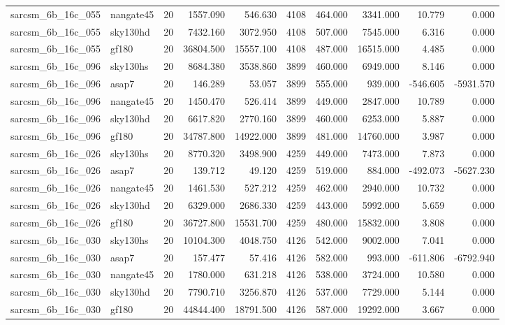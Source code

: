 \begin{longtable}{llrrrrrrrr}
sarcsm\_6b\_16c\_055 & nangate45 & 20 & 1557.090 & 546.630 & 4108 & 464.000 & 3341.000 & 10.779 & 0.000 \\
sarcsm\_6b\_16c\_055 & sky130hd & 20 & 7432.160 & 3072.950 & 4108 & 507.000 & 7545.000 & 6.316 & 0.000 \\
sarcsm\_6b\_16c\_055 & gf180 & 20 & 36804.500 & 15557.100 & 4108 & 487.000 & 16515.000 & 4.485 & 0.000 \\
sarcsm\_6b\_16c\_096 & sky130hs & 20 & 8684.380 & 3538.860 & 3899 & 460.000 & 6949.000 & 8.146 & 0.000 \\
sarcsm\_6b\_16c\_096 & asap7 & 20 & 146.289 & 53.057 & 3899 & 555.000 & 939.000 & -546.605 & -5931.570 \\
sarcsm\_6b\_16c\_096 & nangate45 & 20 & 1450.470 & 526.414 & 3899 & 449.000 & 2847.000 & 10.789 & 0.000 \\
sarcsm\_6b\_16c\_096 & sky130hd & 20 & 6617.820 & 2770.160 & 3899 & 460.000 & 6253.000 & 5.887 & 0.000 \\
sarcsm\_6b\_16c\_096 & gf180 & 20 & 34787.800 & 14922.000 & 3899 & 481.000 & 14760.000 & 3.987 & 0.000 \\
sarcsm\_6b\_16c\_026 & sky130hs & 20 & 8770.320 & 3498.900 & 4259 & 449.000 & 7473.000 & 7.873 & 0.000 \\
sarcsm\_6b\_16c\_026 & asap7 & 20 & 139.712 & 49.120 & 4259 & 519.000 & 884.000 & -492.073 & -5627.230 \\
sarcsm\_6b\_16c\_026 & nangate45 & 20 & 1461.530 & 527.212 & 4259 & 462.000 & 2940.000 & 10.732 & 0.000 \\
sarcsm\_6b\_16c\_026 & sky130hd & 20 & 6329.000 & 2686.330 & 4259 & 443.000 & 5992.000 & 5.659 & 0.000 \\
sarcsm\_6b\_16c\_026 & gf180 & 20 & 36727.800 & 15531.700 & 4259 & 480.000 & 15832.000 & 3.808 & 0.000 \\
sarcsm\_6b\_16c\_030 & sky130hs & 20 & 10104.300 & 4048.750 & 4126 & 542.000 & 9002.000 & 7.041 & 0.000 \\
sarcsm\_6b\_16c\_030 & asap7 & 20 & 157.477 & 57.416 & 4126 & 582.000 & 993.000 & -611.806 & -6792.940 \\
sarcsm\_6b\_16c\_030 & nangate45 & 20 & 1780.000 & 631.218 & 4126 & 538.000 & 3724.000 & 10.580 & 0.000 \\
sarcsm\_6b\_16c\_030 & sky130hd & 20 & 7790.710 & 3256.870 & 4126 & 537.000 & 7729.000 & 5.144 & 0.000 \\
sarcsm\_6b\_16c\_030 & gf180 & 20 & 44844.400 & 18791.500 & 4126 & 587.000 & 19292.000 & 3.667 & 0.000 \\

\end{longtable}
